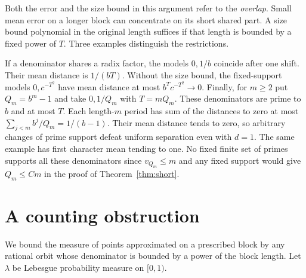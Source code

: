 \documentclass[11pt]{article}
\begin{document}
Both the error and the size bound in this argument refer to the \emph{overlap}. Small mean error on a longer block can concentrate on its short shared part. A size bound polynomial in the original length suffices if that length is bounded by a fixed power of \(T\). Three examples distinguish the restrictions.

If a denominator shares a radix factor, the models \(0,1/b\) coincide after one shift. Their mean distance is \(1/(bT)\). Without the size bound, the fixed-support models \(0,c^{-T^2}\) have mean distance at most \(b^Tc^{-T^2}\to0\). Finally, for \(m\ge2\) put \(Q_m=b^m-1\) and take \(0,1/Q_m\) with \(T=mQ_m\). These denominators are prime to \(b\) and at most \(T\). Each length-\(m\) period has sum of the distances to zero at most \(\sum_{j<m} b^j/Q_m=1/(b-1)\). Their mean distance tends to zero, so arbitrary changes of prime support defeat uniform separation even with \(d=1\). The same example has first character mean tending to one. No fixed finite set of primes supports all these denominators since \(v_{Q_m}\le m\) and any fixed support would give \(Q_m\le C m\) in the proof of Theorem~\ref{thm:short}.

\section{A counting obstruction}\label{sec:count}
We bound the measure of points approximated on a prescribed block by any rational orbit whose denominator is bounded by a power of the block length. Let \(\lambda\) be Lebesgue probability measure on \([0,1)\).
\end{document}
